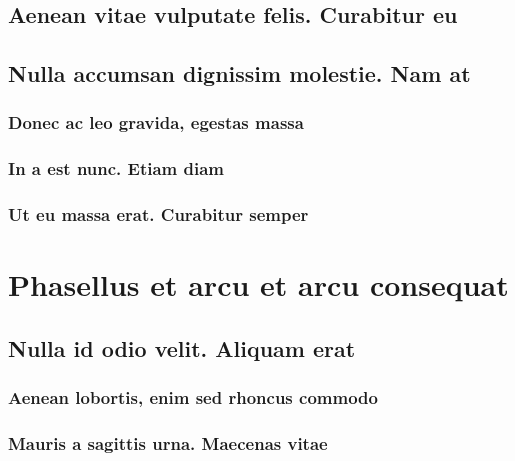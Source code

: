 \documentclass[%
  german,%
  exercise,%
  oneside,%
]{iswartcl}
\begin{document}
\lipsum[1-8]

\subsection{Aenean vitae vulputate felis. Curabitur eu}

\lipsum[1-8]

\subsection{Nulla accumsan dignissim molestie. Nam at}

\lipsum[1-8]

\subsubsection{Donec ac leo gravida, egestas massa}

\lipsum[1-8]

\subsubsection{In a est nunc. Etiam diam}

\lipsum[1-8]

\subsubsection{Ut eu massa erat. Curabitur semper}

\lipsum[1-8]

\section{Phasellus et arcu et arcu consequat}

\lipsum[1-8]

\subsection{Nulla id odio velit. Aliquam erat}

\lipsum[1-8]

\subsubsection{Aenean lobortis, enim sed rhoncus commodo}

\lipsum[1-8]

\subsubsection{Mauris a sagittis urna. Maecenas vitae}
\end{document}
